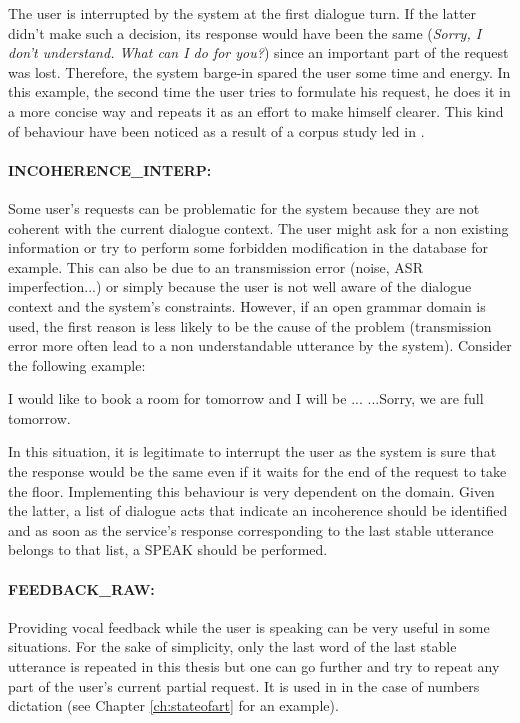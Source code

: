           The user is interrupted by the system at the first dialogue turn. If the latter didn't make such a decision, its response would have been the same (\textit{Sorry, I don't understand. What can I do for you?}) since an important part of the request was lost. Therefore, the system barge-in spared the user some time and energy. In this example, the second time the user tries to formulate his request, he does it in a more concise way and repeats it as an effort to make himself clearer. This kind of behaviour have been noticed as a result of a corpus study led in \cite{Ghigi2014}.

     \paragraph{INCOHERENCE\_INTERP:} Some user's requests can be problematic for the system because they are not coherent with the current dialogue context. The user might ask for a non existing information or try to perform some forbidden modification in the database for example. This can also be due to an transmission error (noise, ASR imperfection...) or simply because the user is not well aware of the dialogue context and the system's constraints. However, if an open grammar domain is used, the first reason is less likely to be the cause of the problem (transmission error more often lead to a non understandable utterance by the system). Consider the following example:
		
					\begin{dialogue}
						 I would like to book a room for tomorrow and I will be ...
						 ...Sorry, we are full tomorrow.
					\end{dialogue}
					
					In this situation, it is legitimate to interrupt the user as the system is sure that the response would be the same even if it waits for the end of the request to take the floor. Implementing this behaviour is very dependent on the domain. Given the latter, a list of dialogue acts that indicate an incoherence should be identified and as soon as the service's response corresponding to the last stable utterance belongs to that list, a SPEAK should be performed.
					
			\paragraph{FEEDBACK\_RAW:} Providing vocal feedback while the user is speaking can be very useful in some situations. For the sake of simplicity, only the last word of the last stable utterance is repeated in this thesis but one can go further and try to repeat any part of the user's current partial request. It is used in \cite{Skantze2009,Khouzaimi2014a} in the case of numbers dictation (see Chapter \ref{ch:stateofart} for an example).
			
